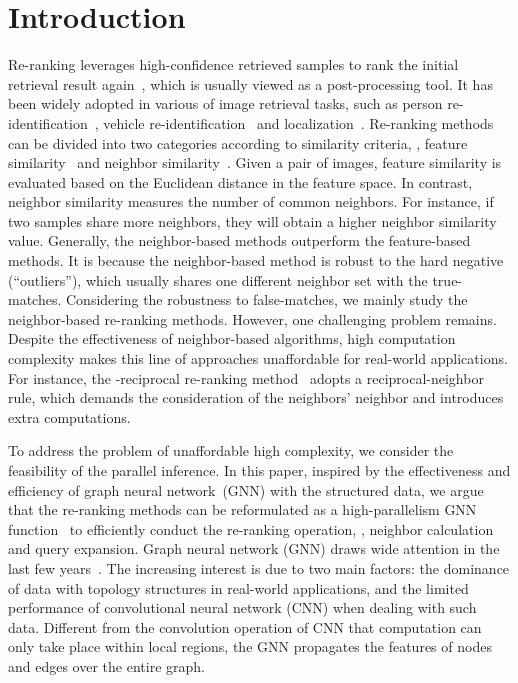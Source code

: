 \documentclass[10pt,twocolumn,letterpaper]{article}
\begin{document}
\section{Introduction}
Re-ranking leverages high-confidence retrieved samples to rank the initial retrieval result again~\cite{chum2007total, jegou2007contextual, qin2011hello}, which is usually viewed as a post-processing tool.
It has been widely adopted in various of image retrieval tasks, such as person re-identification~\cite{zhong2017re, saquib2018pose,zheng2018pedestrian},
vehicle re-identification~\cite{huang2019multi,zheng2020vehiclenet} and localization~\cite{shen2012object,zheng2020university}. 
Re-ranking methods can be divided into two categories according to similarity criteria, \ie, feature similarity~\cite{chum2007total, radenovic2018fine} and neighbor similarity~\cite{bai2016sparse, zhong2017re}. 
Given a pair of images, feature similarity is evaluated based on the Euclidean distance in the feature space. In contrast, neighbor similarity measures the number of common neighbors.
For instance, if two samples share more neighbors, they will obtain a higher neighbor similarity value. 
Generally, the neighbor-based methods outperform the feature-based methods. It is because the neighbor-based method is robust to the hard negative (``outliers''), which usually shares one different neighbor set with the true-matches. Considering the robustness to false-matches, we mainly study the neighbor-based re-ranking methods. However, one challenging problem remains. Despite the effectiveness of neighbor-based algorithms, high computation complexity makes this line of approaches unaffordable for real-world applications. 
For instance, the -reciprocal re-ranking method~\cite{zhong2017re} adopts a reciprocal-neighbor rule, which demands the consideration of the neighbors' neighbor and introduces extra computations.

To address the problem of unaffordable high complexity, we consider the feasibility of the parallel inference. In this paper, inspired by the effectiveness and efficiency of graph neural network~(GNN) with the structured data, 
we argue that the re-ranking methods can be reformulated as a high-parallelism GNN function~\cite{gori2005new, bruna2013spectral} to efficiently conduct the re-ranking operation, \eg, neighbor calculation and query expansion. Graph neural network (GNN) draws wide attention in the last few years~\cite{scarselli2008graph}. The increasing interest is due to two main factors: the dominance of data with topology structures in real-world applications, and the limited performance of convolutional neural network (CNN) when dealing with such data. 
Different from the convolution operation of CNN that computation can only take place within local regions, the GNN propagates the features of nodes and edges over the entire graph. 
\end{document}

